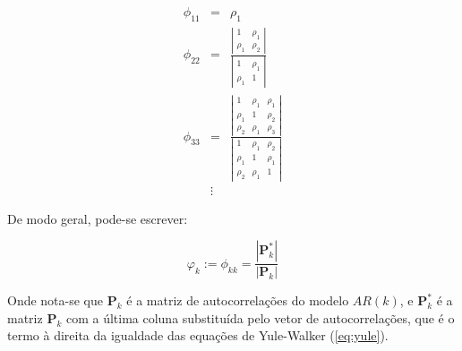 \[
\begin{array}{rcl}
\phi_{11} & = & \rho_1 \\
\phi_{22} & = & \frac{\left| \begin{array}{cc}1&\rho_1\\\rho_1&\rho_2\end{array} \right|}{\left| \begin{array}{cc}1&\rho_1\\\rho_1&1\end{array} \right|}  \\
\phi_{33} & = & \frac{\left| \begin{array}{ccc}1&\rho_1&\rho_1\\\rho_1&1&\rho_2\\\rho_2&\rho_1&\rho_3\end{array} \right|}{\left| \begin{array}{ccc}1&\rho_1&\rho_2\\\rho_1&1&\rho_1\\\rho_2&\rho_1&1\end{array} \right|}\\
& \vdots &
\end{array}
\]

De modo geral, pode-se escrever:

\begin{equation}\label{defi:parcial}
\varphi_k := \phi_{kk} = \dfrac{|\mathbf{P}_k^{*}|}{|\mathbf{P}_k|}
\end{equation}

Onde nota-se que $\mathbf{P}_k$ é a matriz de autocorrelações do modelo $AR(k)$, e $\mathbf{P}_k^{*}$ é a matriz $\mathbf{P}_k$ com a última coluna substituída pelo vetor de autocorrelações, que é o termo à direita da igualdade das equações de Yule-Walker (\ref{eq:yule}).